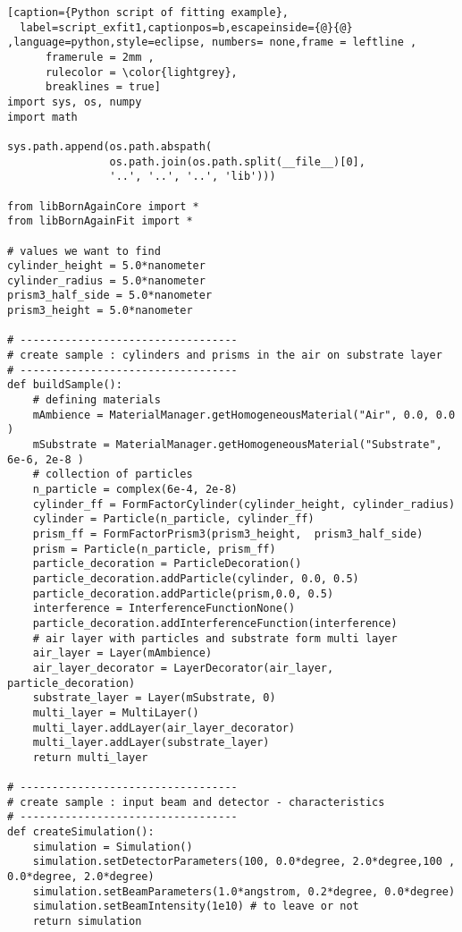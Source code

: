 \begin{lstlisting}[caption={Python script of fitting example},
  label=script_exfit1,captionpos=b,escapeinside={@}{@} ,language=python,style=eclipse, numbers= none,frame = leftline ,
      framerule = 2mm ,
      rulecolor = \color{lightgrey},
      breaklines = true]
import sys, os, numpy
import math 

sys.path.append(os.path.abspath(
                os.path.join(os.path.split(__file__)[0],
                '..', '..', '..', 'lib')))

from libBornAgainCore import *
from libBornAgainFit import *

# values we want to find
cylinder_height = 5.0*nanometer
cylinder_radius = 5.0*nanometer
prism3_half_side = 5.0*nanometer
prism3_height = 5.0*nanometer

# ----------------------------------
# create sample : cylinders and prisms in the air on substrate layer
# ----------------------------------
def buildSample(): 
    # defining materials
    mAmbience = MaterialManager.getHomogeneousMaterial("Air", 0.0, 0.0 )
    mSubstrate = MaterialManager.getHomogeneousMaterial("Substrate", 6e-6, 2e-8 )
    # collection of particles
    n_particle = complex(6e-4, 2e-8)
    cylinder_ff = FormFactorCylinder(cylinder_height, cylinder_radius)
    cylinder = Particle(n_particle, cylinder_ff)
    prism_ff = FormFactorPrism3(prism3_height,  prism3_half_side)
    prism = Particle(n_particle, prism_ff)
    particle_decoration = ParticleDecoration()
    particle_decoration.addParticle(cylinder, 0.0, 0.5)
    particle_decoration.addParticle(prism,0.0, 0.5)  
    interference = InterferenceFunctionNone()
    particle_decoration.addInterferenceFunction(interference)
    # air layer with particles and substrate form multi layer
    air_layer = Layer(mAmbience)
    air_layer_decorator = LayerDecorator(air_layer, particle_decoration)
    substrate_layer = Layer(mSubstrate, 0)
    multi_layer = MultiLayer()
    multi_layer.addLayer(air_layer_decorator)
    multi_layer.addLayer(substrate_layer)
    return multi_layer

# ----------------------------------
# create sample : input beam and detector - characteristics
# ----------------------------------
def createSimulation():
    simulation = Simulation()
    simulation.setDetectorParameters(100, 0.0*degree, 2.0*degree,100 , 0.0*degree, 2.0*degree)
    simulation.setBeamParameters(1.0*angstrom, 0.2*degree, 0.0*degree)
    simulation.setBeamIntensity(1e10) # to leave or not
    return simulation


\end{lstlisting}
